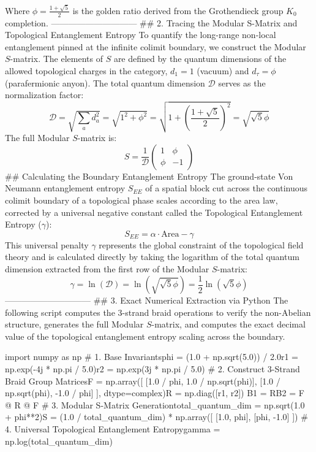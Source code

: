Where $\phi = \frac{1+\sqrt{5}}{2}$ is the golden ratio derived from the Grothendieck group $K_0$ completion.
------------------------------
## 2. Tracing the Modular S-Matrix and Topological Entanglement Entropy
To quantify the long-range non-local entanglement pinned at the infinite colimit boundary, we construct the Modular $S$-matrix. The elements of $S$ are defined by the quantum dimensions of the allowed topological charges in the category, $d_1 = 1$ (vacuum) and $d_\tau = \phi$ (parafermionic anyon).
The total quantum dimension $\mathcal{D}$ serves as the normalization factor:
$$\mathcal{D} = \sqrt{\sum_{a} d_a^2} = \sqrt{1^2 + \phi^2} = \sqrt{1 + \left(\frac{1+\sqrt{5}}{2}\right)^2} = \sqrt{\sqrt{5}\phi}$$ 
The full Modular $S$-matrix is:
$$S = \frac{1}{\mathcal{D}} \begin{pmatrix} 1 & \phi \\ \phi & -1 \end{pmatrix}$$ 
## Calculating the Boundary Entanglement Entropy
The ground-state Von Neumann entanglement entropy $S_{EE}$ of a spatial block cut across the continuous colimit boundary of a topological phase scales according to the area law, corrected by a universal negative constant called the Topological Entanglement Entropy ($\gamma$):
$$S_{EE} = \alpha \cdot \text{Area} - \gamma$$ 
This universal penalty $\gamma$ represents the global constraint of the topological field theory and is calculated directly by taking the logarithm of the total quantum dimension extracted from the first row of the Modular $S$-matrix:
$$\gamma = \ln(\mathcal{D}) = \ln\left(\sqrt{\sqrt{5}\phi}\right) = \frac{1}{2}\ln(\sqrt{5}\phi)$$ 
------------------------------
## 3. Exact Numerical Extraction via Python
The following script computes the 3-strand braid operations to verify the non-Abelian structure, generates the full Modular $S$-matrix, and computes the exact decimal value of the topological entanglement entropy scaling across the boundary.

import numpy as np
# 1. Base Invariantsphi = (1.0 + np.sqrt(5.0)) / 2.0r1 = np.exp(-4j * np.pi / 5.0)r2 = np.exp(3j * np.pi / 5.0)
# 2. Construct 3-Strand Braid Group MatricesF = np.array([
    [1.0 / phi, 1.0 / np.sqrt(phi)],
    [1.0 / np.sqrt(phi), -1.0 / phi]
], dtype=complex)R = np.diag([r1, r2])
B1 = RB2 = F @ R @ F
# 3. Modular S-Matrix Generationtotal_quantum_dim = np.sqrt(1.0 + phi**2)S = (1.0 / total_quantum_dim) * np.array([
    [1.0, phi],
    [phi, -1.0]
])
# 4. Universal Topological Entanglement Entropygamma = np.log(total_quantum_dim)

